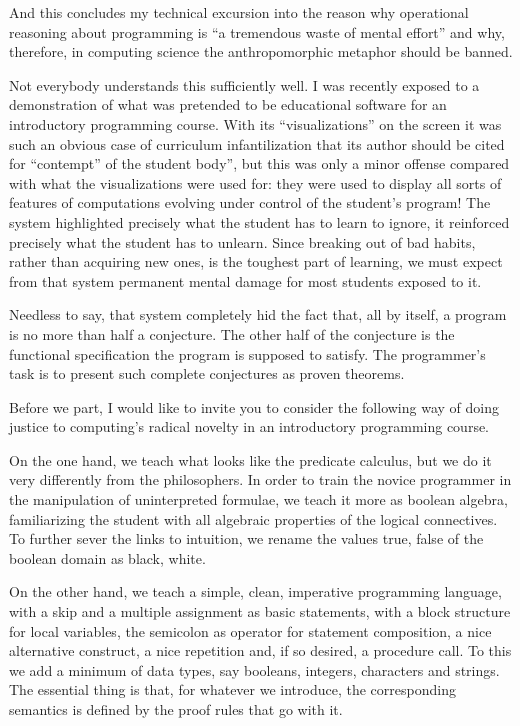 \documentclass[a4paper,12pt]{article}
\begin{document}
And this concludes my technical excursion into the reason why
operational reasoning about programming is ``a tremendous waste of
mental effort'' and why, therefore, in computing science the
anthropomorphic metaphor should be banned.

Not everybody understands this sufficiently well.  I was recently
exposed to a demonstration of what was pretended to be educational
software for an introductory programming course.  With its
``visualizations'' on the screen it was such an obvious case of
curriculum infantilization that its author should be cited for
``contempt'' of the student body'', but this was only a minor offense
compared with what the visualizations were used for: they were used to
display all sorts of features of computations evolving under control of
the student's program! The system highlighted precisely what the student
has to learn to ignore, it reinforced precisely what the student has to
unlearn.  Since breaking out of bad habits, rather than acquiring new
ones, is the toughest part of learning, we must expect from that system
permanent mental damage for most students exposed to it.

Needless to say, that system completely hid the fact that, all by
itself, a program is no more than half a conjecture.  The other half of
the conjecture is the functional specification the program is supposed
to satisfy.  The programmer's task is to present such complete
conjectures as proven theorems.

Before we part, I would like to invite you to consider the following way
of doing justice to computing's radical novelty in an introductory
programming course.

On the one hand, we teach what looks like the predicate calculus, but we
do it very differently from the philosophers.  In order to train the
novice programmer in the manipulation of uninterpreted formulae, we
teach it more as boolean algebra, familiarizing the student with all
algebraic properties of the logical connectives.  To further sever the
links to intuition, we rename the values {true, false} of the boolean
domain as {black, white}.

On the other hand, we teach a simple, clean, imperative programming
language, with a skip and a multiple assignment as basic statements,
with a block structure for local variables, the semicolon as operator
for statement composition, a nice alternative construct, a nice
repetition and, if so desired, a procedure call.  To this we add a
minimum of data types, say booleans, integers, characters and strings.
The essential thing is that, for whatever we introduce, the
corresponding semantics is defined by the proof rules that go with it.
\end{document}
